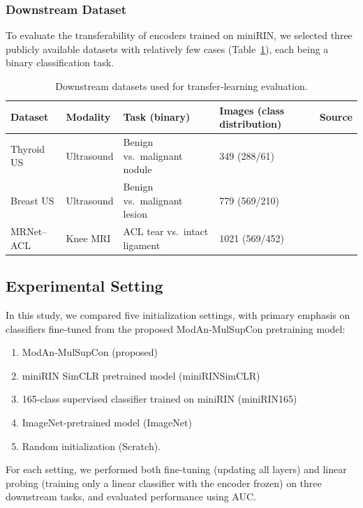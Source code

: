 \documentclass[final,1p,times]{elsarticle}
\begin{document}
\subsubsection{Downstream Dataset}
To evaluate the transferability of encoders trained on miniRIN, we selected three publicly available datasets with relatively few cases (Table~\ref{tab:down_ds}), each being a binary classification task.

\begin{table}[h]
    \centering
    \caption{Downstream datasets used for transfer‐learning evaluation.}
    \label{tab:down_ds}
    \begin{tabular}{lllll}
        \toprule
        Dataset & Modality & Task (binary) &  Images (class distribution) & Source \\
        \midrule
        Thyroid US & Ultrasound & Benign vs.~malignant nodule & 349 (288/61) & \cite{pedraza_open_2015} \\
        Breast US  & Ultrasound & Benign vs.~malignant lesion  & 779 (569/210) & \cite{al-dhabyani_dataset_2020} \\
        MRNet–ACL  & Knee MRI   & ACL tear vs.~intact ligament & 1021 (569/452) & \cite{bien_deep-learning-assisted_2018} \\
        \bottomrule
    \end{tabular}
\end{table}

\subsection{Experimental Setting}
In this study, we compared five initialization settings, with primary emphasis on classifiers fine‑tuned from the proposed ModAn‑MulSupCon pretraining model:
\begin{enumerate}
  \item ModAn‑MulSupCon (proposed)
  \item miniRIN SimCLR pretrained model (miniRINSimCLR)
  \item 165‑class supervised classifier trained on miniRIN (miniRIN165)
  \item ImageNet‑pretrained model (ImageNet)
  \item Random initialization (Scratch).
\end{enumerate}

For each setting, we performed both fine‑tuning (updating all layers) and linear probing (training only a linear classifier with the encoder frozen) on three downstream tasks, and evaluated performance using AUC.
\end{document}
